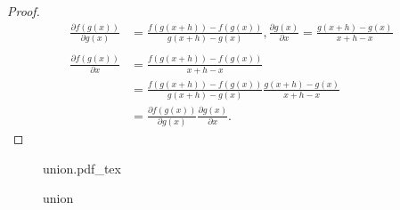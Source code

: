 \documentclass{article}
\newtheorem{proof}{Proof}
\newcommand{\incfig}[2]{
    \def\svgwidth{#2\columnwidth}
    {#1.pdf_tex}
}
\begin{document}
\begin{proof}
    \label{pf:chain-rule}
\begin{align*}
    \frac{\partial f(g(x))}{\partial g(x)} &= \frac{f(g(x+h)) - f(g(x))}{g(x+h) - g(x)}, \frac{\partial g(x)}{\partial x} = \frac{g(x+h) - g(x)}{x+h-x} \\ \\
    \frac{\partial f(g(x))}{\partial x} &= \frac{f(g(x+h)) - f(g(x))}{x+h-x}  \\
        &=\frac{f(g(x+h)) - f(g(x))}{g(x+h) - g(x)} \frac{g(x+h) - g(x)}{x + h - x} \\
        &= \frac{\partial f(g(x))}{\partial g(x)} \frac{\partial g(x)}{\partial x} 
.\end{align*}
\end{proof}

\begin{figure}
    \center
    \incfig{union}{.4}
    \caption{union}
\end{figure}
\end{document}
